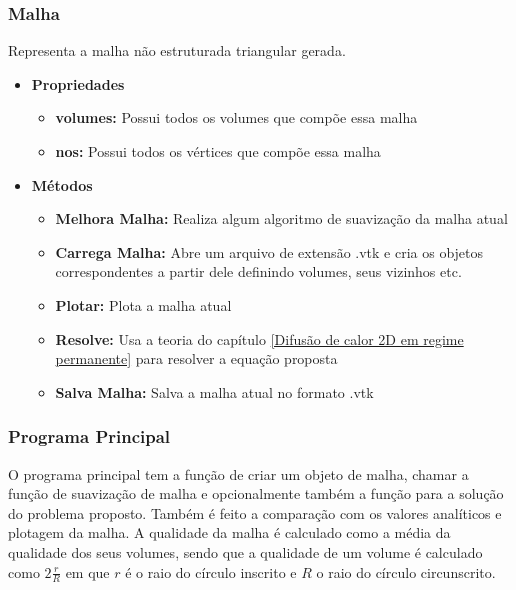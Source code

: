 \subsubsection{Malha}
Representa a malha não estruturada triangular gerada.

\begin{itemize}
    \item \textbf{Propriedades}
    \begin{itemize}
        \item \textbf{volumes:} Possui todos os volumes que compõe essa malha
        \item \textbf{nos:} Possui todos os vértices que compõe essa malha
    \end{itemize}
    \item \textbf{Métodos}
    \begin{itemize}
        \item \textbf{Melhora Malha:} Realiza algum algoritmo de suavização da malha atual
        \item \textbf{Carrega Malha:} Abre um arquivo de extensão .vtk e cria os objetos correspondentes a partir dele definindo volumes, seus vizinhos etc.
        \item \textbf{Plotar:} Plota a malha atual
        \item \textbf{Resolve:} Usa a teoria do capítulo \ref{Difusão de calor 2D em regime permanente} para resolver a equação proposta
        \item \textbf{Salva Malha:} Salva a malha atual no formato .vtk
    \end{itemize}
\end{itemize}

\subsubsection{Programa Principal}
O programa principal tem a função de criar um objeto de malha, chamar a função de suavização de malha e opcionalmente também a função para a solução do problema proposto. Também é feito a comparação com os valores analíticos e plotagem da malha. A qualidade da malha é calculado como a média da qualidade dos seus volumes, sendo que a qualidade de um volume é calculado como $2\frac{r}{R}$ em que $r$ é o raio do círculo inscrito e $R$ o raio do círculo circunscrito.